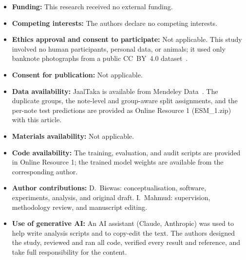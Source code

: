 \documentclass[pdflatex,sn-mathphys-num]{sn-jnl}
\begin{document}
\begin{itemize}
\item \textbf{Funding:} This research received no external funding.
\item \textbf{Competing interests:} The authors declare no competing interests.
\item \textbf{Ethics approval and consent to participate:} Not applicable. This study
involved no human participants, personal data, or animals; it used only banknote
photographs from a public CC~BY~4.0 dataset~\cite{jaaltaka_data}.
\item \textbf{Consent for publication:} Not applicable.
\item \textbf{Data availability:} JaalTaka is available from Mendeley
Data~\cite{jaaltaka_data}. The duplicate groups, the note-level and group-aware split
assignments, and the per-note test predictions are provided as Online Resource 1
(ESM\_1.zip) with this article.
\item \textbf{Materials availability:} Not applicable.
\item \textbf{Code availability:} The training, evaluation, and audit scripts are
provided in Online Resource 1; the trained model weights are
available from the corresponding author.
\item \textbf{Author contributions:} D.~Biswas: conceptualisation, software,
experiments, analysis, and original draft. I.~Mahmud: supervision, methodology review,
and manuscript editing.
\item \textbf{Use of generative AI:} An AI assistant (Claude, Anthropic) was used to
help write analysis scripts and to copy-edit the text. The authors designed the study,
reviewed and ran all code, verified every result and reference, and take full
responsibility for the content.
\end{itemize}


\end{document}
